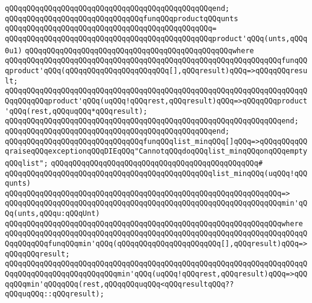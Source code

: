 \verb|qQQqqQQqqQQqqQQqqQQqqQQqqQQqqQQqqQQqqQQqqQQqqQQqend;|\newline
\newline
\verb|qQQqqQQqqQQqqQQqqQQqqQQqqQQqqQQqfunqQQqproductqQQqunts|\newline
\verb|qQQqqQQqqQQqqQQqqQQqqQQqqQQqqQQqqQQqqQQqqQQqqQQq=|\newline
\verb|qQQqqQQqqQQqqQQqqQQqqQQqqQQqqQQqqQQqqQQqqQQqqQQqproduct'qQQq(unts,qQQq0u1)|\newline
\verb|qQQqqQQqqQQqqQQqqQQqqQQqqQQqqQQqqQQqqQQqqQQqqQQqwhere|\newline
\verb|qQQqqQQqqQQqqQQqqQQqqQQqqQQqqQQqqQQqqQQqqQQqqQQqqQQqqQQqqQQqqQQqfunqQQqproduct'qQQq(qQQqqQQqqQQqqQQqqQQqqQQq[],qQQqresult)qQQq=>qQQqqQQqresult;|\newline
\verb|qQQqqQQqqQQqqQQqqQQqqQQqqQQqqQQqqQQqqQQqqQQqqQQqqQQqqQQqqQQqqQQqqQQqqQQqqQQqqQQqproduct'qQQq(uqQQq!qQQqrest,qQQqresult)qQQq=>qQQqqQQqproduct'qQQq(rest,qQQquqQQq*qQQqresult);|\newline
\verb|qQQqqQQqqQQqqQQqqQQqqQQqqQQqqQQqqQQqqQQqqQQqqQQqqQQqqQQqqQQqqQQqend;|\newline
\verb|qQQqqQQqqQQqqQQqqQQqqQQqqQQqqQQqqQQqqQQqqQQqqQQqend;|\newline
\newline
\verb|qQQqqQQqqQQqqQQqqQQqqQQqqQQqqQQqfunqQQqlist_minqQQq[]qQQq=>qQQqqQQqqQQqraiseqQQqexceptionqQQqDIEqQQq"CannotqQQqdoqQQqlist_minqQQqonqQQqemptyqQQqlist";|\newline
\verb|qQQqqQQqqQQqqQQqqQQqqQQqqQQqqQQqqQQqqQQqqQQqqQQq#|\newline
\verb|qQQqqQQqqQQqqQQqqQQqqQQqqQQqqQQqqQQqqQQqqQQqqQQqlist_minqQQq(uqQQq!qQQqunts)|\newline
\verb|qQQqqQQqqQQqqQQqqQQqqQQqqQQqqQQqqQQqqQQqqQQqqQQqqQQqqQQqqQQqqQQq=>|\newline
\verb|qQQqqQQqqQQqqQQqqQQqqQQqqQQqqQQqqQQqqQQqqQQqqQQqqQQqqQQqqQQqqQQqmin'qQQq(unts,qQQqu:qQQqUnt)|\newline
\verb|qQQqqQQqqQQqqQQqqQQqqQQqqQQqqQQqqQQqqQQqqQQqqQQqqQQqqQQqqQQqqQQqwhere|\newline
\verb|qQQqqQQqqQQqqQQqqQQqqQQqqQQqqQQqqQQqqQQqqQQqqQQqqQQqqQQqqQQqqQQqqQQqqQQqqQQqqQQqfunqQQqmin'qQQq(qQQqqQQqqQQqqQQqqQQqqQQq[],qQQqresult)qQQq=>qQQqqQQqresult;|\newline
\verb|qQQqqQQqqQQqqQQqqQQqqQQqqQQqqQQqqQQqqQQqqQQqqQQqqQQqqQQqqQQqqQQqqQQqqQQqqQQqqQQqqQQqqQQqqQQqqQQqmin'qQQq(uqQQq!qQQqrest,qQQqresult)qQQq=>qQQqqQQqmin'qQQqqQQq(rest,qQQqqQQquqQQq<qQQqresultqQQq??qQQquqQQq::qQQqresult);|\newline
